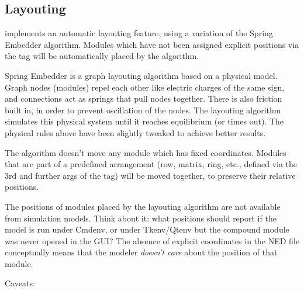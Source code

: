 
\subsection{Layouting}
\label{sec:ch-graphics:layouting}

{\opp} implements an automatic layouting feature, using a variation of the
Spring Embedder algorithm. Modules which have not been assigned explicit
positions via the  tag will be automatically placed by the
algorithm.

Spring Embedder is a graph layouting algorithm based on a physical model.
Graph nodes (modules) repel each other like electric charges of the same
sign, and connections act as springs that pull nodes together. There is
also friction built in, in order to prevent oscillation of the nodes. The
layouting algorithm simulates this physical system until it reaches
equilibrium (or times out). The physical rules above have been slightly
tweaked to achieve better results.

The algorithm doesn't move any module which has fixed coordinates. Modules
that are part of a predefined arrangement (row, matrix, ring, etc., defined
via the 3rd and further args of the  tag) will be moved together,
to preserve their relative positions.

\begin{note}
The positions of modules placed by the layouting algorithm are not
available from simulation models. Think about it: what positions should
{\opp} report if the model is run under Cmdenv, or under Tkenv/Qtenv but
the compound module was never opened in the GUI? The absence of explicit
coordinates in the NED file conceptually means that the modeler
\textit{doesn't care} about the position of that module.
\end{note}

Caveats:

